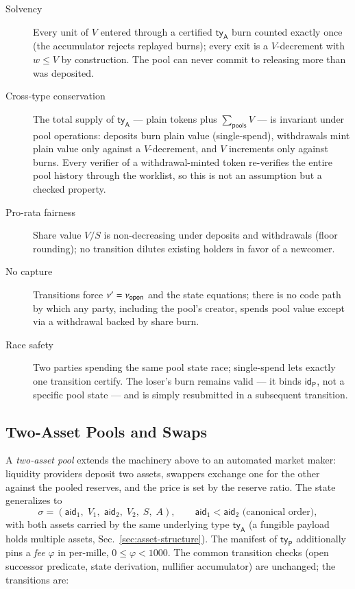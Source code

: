 \begin{description}
	\item[Solvency] Every unit of $V$ entered through a certified $\mathsf{ty}_\mathsf{A}$ burn counted exactly once (the accumulator rejects replayed burns); every exit is a $V$-decrement with $w \le V$ by construction. The pool can never commit to releasing more than was deposited.
	\item[Cross-type conservation] The total supply of $\mathsf{ty}_\mathsf{A}$ --- plain tokens plus $\sum_\mathsf{pools} V$ --- is invariant under pool operations: deposits burn plain value (single-spend), withdrawals mint plain value only against a $V$-decrement, and $V$ increments only against burns. Every verifier of a withdrawal-minted token re-verifies the entire pool history through the worklist, so this is not an assumption but a checked property.
	\item[Pro-rata fairness] Share value $V/S$ is non-decreasing under deposits and withdrawals (floor rounding); no transition dilutes existing holders in favor of a newcomer.
	\item[No capture] Transitions force $\nu' = \nu_\mathsf{open}$ and the state equations; there is no code path by which any party, including the pool's creator, spends pool value except via a withdrawal backed by share burn.
	\item[Race safety] Two parties spending the same pool state race; single-spend lets exactly one transition certify. The loser's burn remains valid --- it binds $\mathsf{id}_\mathsf{P}$, not a specific pool state --- and is simply resubmitted in a subsequent transition.
\end{description}

\subsection{Two-Asset Pools and Swaps}\label{app:pool-swaps}

A \emph{two-asset pool} extends the machinery above to an automated market maker: liquidity providers deposit two assets, swappers exchange one for the other against the pooled reserves, and the price is set by the reserve ratio. The state generalizes to
\[
\sigma = (\mathsf{aid}_1,\; V_1,\; \mathsf{aid}_2,\; V_2,\; S,\; A),
\qquad \mathsf{aid}_1 < \mathsf{aid}_2 \text{ (canonical order)},
\]
with both assets carried by the same underlying type $\mathsf{ty}_\mathsf{A}$ (a fungible payload holds multiple assets, Sec.~\ref{sec:asset-structure}). The manifest of $\mathsf{ty}_\mathsf{P}$ additionally pins a \emph{fee} $\varphi$ in per-mille, $0 \le \varphi < 1000$. The common transition checks (open successor predicate, state derivation, nullifier accumulator) are unchanged; the transitions are:


